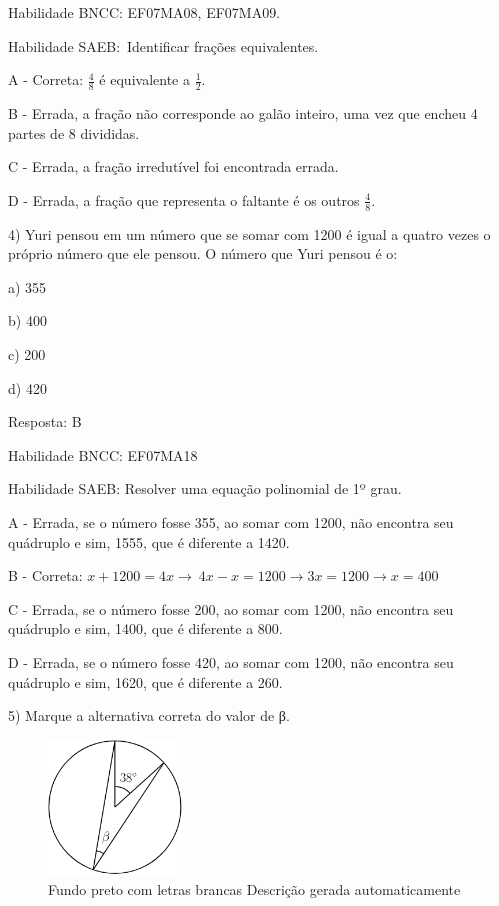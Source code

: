 Habilidade BNCC: EF07MA08, EF07MA09.

Habilidade SAEB:~Identificar frações equivalentes.

A - Correta: \(\frac{4}{8}\) é equivalente a \(\frac{1}{2}\).

B - Errada, a fração não corresponde ao galão inteiro, uma vez que
encheu 4 partes de 8 divididas.

C - Errada, a fração irredutível foi encontrada errada.

D - Errada, a fração que representa o faltante é os outros
\(\frac{4}{8}\).

4) Yuri pensou em um número que se somar com 1200 é igual a quatro vezes
o próprio número que ele pensou. O número que Yuri pensou é o:

a) 355

b) 400

c) 200

d) 420

Resposta: B

Habilidade BNCC: EF07MA18

Habilidade SAEB: Resolver uma equação polinomial de 1º grau.

A - Errada, se o número fosse 355, ao somar com 1200, não encontra seu
quádruplo e sim, 1555, que é diferente a 1420.

B - Correta:
\(x + 1200 = 4x \rightarrow \ 4x - x = 1200 \rightarrow 3x = 1200 \rightarrow x = 400\)

C - Errada, se o número fosse 200, ao somar com 1200, não encontra seu
quádruplo e sim, 1400, que é diferente a 800.

D - Errada, se o número fosse 420, ao somar com 1200, não encontra seu
quádruplo e sim, 1620, que é diferente a 260.

5) Marque a alternativa correta do valor de β.

\begin{figure}
\centering
\includegraphics[width=1.39097in,height=1.40903in]{./imgSAEB_7_MAT/media/image108.png}
\caption{Fundo preto com letras brancas Descrição gerada
automaticamente}
\end{figure}

